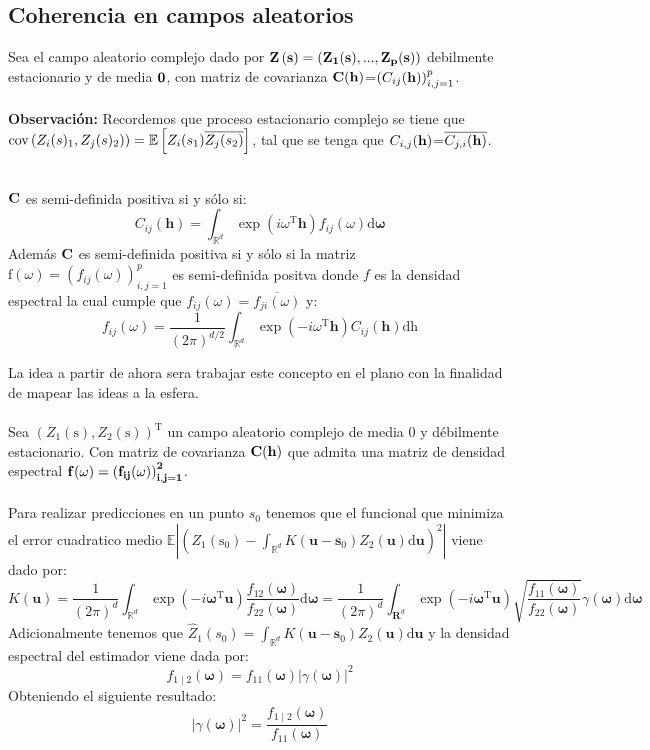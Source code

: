 \subsection{Coherencia en campos aleatorios}
Sea el campo aleatorio complejo dado por $\bf{Z}\left( \bf{s} \right) = \left(  Z_1(\bf{s}),...,Z_p(\bf{s}) \right)$ debilmente estacionario y de media $\bf{0}$, con matriz de covarianza $\bf{C}(\bf{h})$=$\left( 
C_{ij}(\bf{h})
 \right)^p_{i,j=1}$.\\
\\
\textbf{Observación:} Recordemos que proceso estacionario complejo se tiene que $\text{cov}\left(  Z_i(s)_1,Z_j(s)_2)  \right) = \mathbb{E}\left[ Z_i(s_1)\overline{Z_j(s_2)} \right]$, tal que se tenga que $C_{i,j}(\bf{h})$=$\overline{C_{j,i}(\bf{h})}$.\\
\\
\begin{teo*}{}
	\rm
$\bf{C}$ es semi-definida positiva si y sólo si:
$$
C_{i j}(\mathbf{h})=\int_{\mathbb{R}^{d}} \exp \left(i \omega^{\mathrm{T}} \mathbf{h}\right) f_{i j}(\omega) \mathrm{d} \boldsymbol{\omega}
$$
Además $\bf{C}$ es semi-definida positiva si y sólo si la matriz $\mathrm{f}(\omega)=\left(f_{i j}(\omega)\right)_{i, j=1}^{p}$ es semi-definida positva donde $f$ es la densidad espectral la cual cumple que $f_{i j}(\omega)=\overline{f_{j i}(\omega)}$ y:
$$
f_{i j}(\omega)=\frac{1}{(2 \pi)^{d/2}} \int_{\mathbb{R}^{d}} \exp \left(-i \omega^{\mathrm{T}} \mathbf{h}\right) C_{i j}(\mathbf{h}) \mathrm{dh}
$$
\end{teo*}
La idea a partir de ahora sera trabajar este concepto en el plano con la finalidad de mapear las ideas a la esfera.\\
\\
Sea $\left(Z_{1}(\mathrm{s}), Z_{2}(\mathrm{s})\right)^{\mathrm{T}}$ un campo aleatorio complejo de media 0 y débilmente estacionario. Con matriz de covarianza  $\bf{C}(\bf{h})$ que admita una matriz de densidad espectral $\bf{f}(\omega)=\left(f_{i j}(\omega)\right)_{i, j=1}^{2}$.\\
\\
Para realizar predicciones en un punto $s_0$ tenemos que el funcional que minimiza el error cuadratico medio $\displaystyle \mathbb{E}\left|\left(Z_{1}\left(\mathrm{s}_{0}\right)-\int_{\mathbb{R}^{d}} K\left(\mathbf{u}-\mathbf{s}_{0}\right) Z_{2}(\mathbf{u}) \mathrm{d} \mathbf{u}\right)^2\right|$ viene dado por:
$$
K(\mathbf{u})=\frac{1}{(2 \pi)^{d}} \int_{\mathbb{R}^{d}} \exp \left(-i \boldsymbol{\omega}^{\mathrm{T}} \mathbf{u}\right) \frac{f_{12}(\boldsymbol{\omega})}{f_{22}(\boldsymbol{\omega})} \mathrm{d} \boldsymbol{\omega}=\frac{1}{(2 \pi)^{d}} \int_{\mathbf{R}^{d}} \exp \left(-i \boldsymbol{\omega}^{\mathrm{T}} \mathbf{u}\right) \sqrt{\frac{f_{11}(\boldsymbol{\omega})}{f_{22}(\boldsymbol{\omega})}} \gamma(\boldsymbol{\omega}) \mathrm{d} \boldsymbol{\omega}
$$
Adicionalmente tenemos que $\displaystyle \hat{Z}_{1}\left(s_{0}\right)=\int_{\mathbb{R}^{d}} K\left(\mathbf{u}-\mathbf{s}_{0}\right) Z_{2}(\mathbf{u}) \mathrm{d} \mathbf{u}$ y la densidad espectral del estimador viene dada por:
$$
f_{1 \mid 2}(\boldsymbol{\omega})=f_{11}(\boldsymbol{\omega})|\gamma(\boldsymbol{\omega})|^{2}
$$
Obteniendo el siguiente resultado:
$$
|\gamma(\boldsymbol{\omega})|^{2}=\frac{f_{1 \mid 2}(\boldsymbol{\omega})}{f_{11}(\boldsymbol{\omega})}
$$